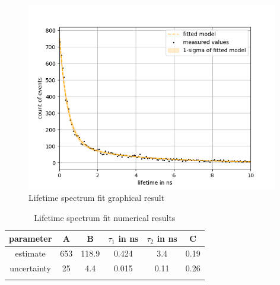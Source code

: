 \begin{figure}[]
    \centering
    \includegraphics[width=110mm,scale=0.5]{Positronium/include/lifetimefit.png}
    \caption{Lifetime spectrum fit graphical result} 
    \label{fig:lifetime}
\end{figure}

\begin{table}[H]
    \centering
    \caption{Lifetime spectrum fit numerical results}
    \begin{tabular}{cccccc}
         parameter & A& B & $\tau_1$ in ns& $\tau_2$ in ns& C\\ \hline
         estimate & 653 & 118.9 & 0.424 & 3.4 & 0.19\\
         uncertainty & 25 & 4.4& 0.015& 0.11& 0.26 \\\hline \\
    \end{tabular}
    \label{tab:lifetime}
\end{table}

